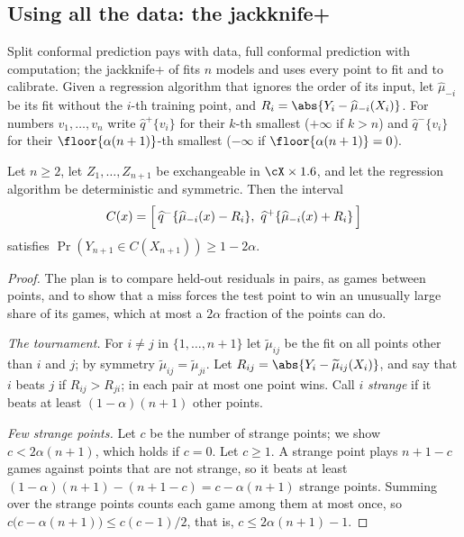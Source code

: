 \begin{refsection}
\subsection{Using all the data: the jackknife+}

Split conformal prediction pays with data, full conformal prediction with computation; the jackknife+ of \textcite{Barber2021a} fits $n$ models and uses every point to fit and to calibrate. Given a regression algorithm that ignores the order of its input, let $\widehat\mu_{-i}$ be its fit without the $i$-th training point, and $R_i=\abs{Y_i-\widehat\mu_{-i}(X_i)}$. For numbers $v_1,\dots,v_n$ write $\widehat q^{+}\{v_i\}$ for their $k$-th smallest ($+\infty$ if $k>n$) and $\widehat q^{-}\{v_i\}$ for their $\floor{\alpha(n+1)}$-th smallest ($-\infty$ if $\floor{\alpha(n+1)}=0$).

\begin{theorem}\label{thm:conformal:jackknife}
Let $n\ge2$, let $Z_1,\dots,Z_{n+1}$ be exchangeable in $\cX\times\R$, and let the regression algorithm be deterministic and symmetric. Then the interval
\[
C(x)=\Bigl[\,\widehat q^{-}\{\widehat\mu_{-i}(x)-R_i\},\ \widehat q^{+}\{\widehat\mu_{-i}(x)+R_i\}\,\Bigr]
\]
satisfies $\Pr(Y_{n+1}\in C(X_{n+1}))\ge1-2\alpha$.
\end{theorem}

\begin{proof}
The plan is to compare held-out residuals in pairs, as games between points, and to show that a miss forces the test point to win an unusually large share of its games, which at most a $2\alpha$ fraction of the points can do.

\emph{The tournament.} For $i\ne j$ in $\{1,\dots,n+1\}$ let $\widetilde\mu_{ij}$ be the fit on all points other than $i$ and $j$; by symmetry $\widetilde\mu_{ij}=\widetilde\mu_{ji}$. Let $R_{ij}=\abs{Y_i-\widetilde\mu_{ij}(X_i)}$, and say that $i$ beats $j$ if $R_{ij}>R_{ji}$; in each pair at most one point wins. Call $i$ \emph{strange} if it beats at least $(1-\alpha)(n+1)$ other points.

\emph{Few strange points.} Let $c$ be the number of strange points; we show $c<2\alpha(n+1)$, which holds if $c=0$. Let $c\ge1$. A strange point plays $n+1-c$ games against points that are not strange, so it beats at least $(1-\alpha)(n+1)-(n+1-c)=c-\alpha(n+1)$ strange points. Summing over the strange points counts each game among them at most once, so $c\bigl(c-\alpha(n+1)\bigr)\le c(c-1)/2$, that is, $c\le2\alpha(n+1)-1$.


\end{proof}
\end{refsection}

